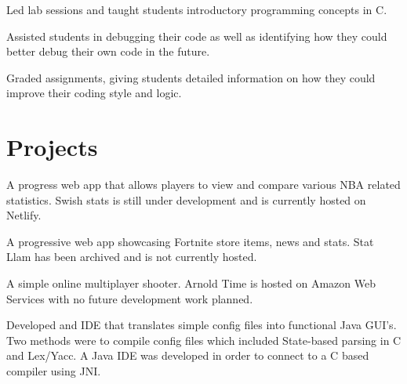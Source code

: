 \documentclass[]{chris_katsaras_resume}
\begin{document}
\begin{minipage}[t]{1\textwidth}
\begin{tightemize}
\item Led lab sessions and taught students introductory programming concepts in C.\item Assisted students in debugging their code as well as identifying how they could better
debug their own code in the future.\item Graded assignments, giving students detailed information on how they could improve
their coding style and logic.
\end{tightemize}

\sectionsep


\section{Projects}
\vspace{2mm}
A progress web app that allows players to view and compare various NBA related statistics. 
Swish stats is still under development and is currently hosted on Netlify.
\sectionsep

\vspace{2mm}
A progressive web app showcasing Fortnite store items, news and stats. Stat Llam has been archived and is not currently hosted.
\sectionsep

\vspace{2mm}

A simple online multiplayer shooter. Arnold Time is hosted on Amazon Web Services with no future development work planned.
\sectionsep

\vspace{2mm}
Developed and IDE that translates simple config files into functional Java GUI’s. Two methods were to compile config files which included State-based parsing in C and Lex/Yacc. A Java IDE was developed in order to connect to a C based compiler using JNI.
\sectionsep


\end{minipage}
\end{document}
